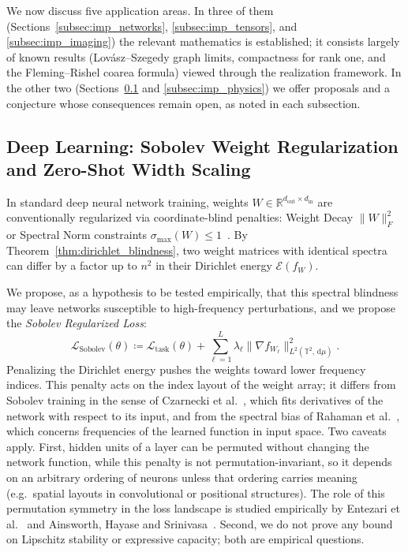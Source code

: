 \documentclass[11pt,a4paper,reqno]{amsart}
\theoremstyle{definition}
\numberwithin{equation}{section}
\newcommand{\R}{\mathbb{R}}
\newcommand{\Tor}{\mathbb{T}}
\newcommand{\dif}{\,\mathrm{d}}
\begin{document}
We now discuss five application areas. In three of them (Sections~\ref{subsec:imp_networks}, \ref{subsec:imp_tensors}, and \ref{subsec:imp_imaging}) the relevant mathematics is established; it consists largely of known results (Lov\'asz--Szegedy graph limits, compactness for rank one, and the Fleming--Rishel coarea formula) viewed through the realization framework. In the other two (Sections~\ref{subsec:imp_dl} and \ref{subsec:imp_physics}) we offer proposals and a conjecture whose consequences remain open, as noted in each subsection.

\subsection{Deep Learning: Sobolev Weight Regularization and Zero-Shot Width Scaling}
\label{subsec:imp_dl}
In standard deep neural network training, weights $W \in \R^{d_{\mathrm{out}} \times d_{\mathrm{in}}}$ are conventionally regularized via coordinate-blind penalties: Weight Decay $\|W\|_F^2$ or Spectral Norm constraints $\sigma_{\max}(W) \le 1$~\cite{yoshida2017spectral,miyato2018spectral}. By Theorem~\ref{thm:dirichlet_blindness}, two weight matrices with identical spectra can differ by a factor up to $n^2$ in their Dirichlet energy $\mathcal{E}(f_W)$.

We propose, as a hypothesis to be tested empirically, that this spectral blindness may leave networks susceptible to high-frequency perturbations, and we propose the \emph{Sobolev Regularized Loss}:
\begin{equation}
    \label{eq:sobolev_loss}
    \mathcal{L}_{\mathrm{Sobolev}}(\theta) \coloneqq \mathcal{L}_{\mathrm{task}}(\theta) + \sum_{\ell=1}^L \lambda_\ell \|\nabla f_{W_\ell}\|_{L^2(\Tor^2, \dif\mu)}^2.
\end{equation}
Penalizing the Dirichlet energy pushes the weights toward lower frequency indices. This penalty acts on the index layout of the weight array; it differs from Sobolev training in the sense of Czarnecki et al.~\cite{czarnecki2017sobolev}, which fits derivatives of the network with respect to its input, and from the spectral bias of Rahaman et al.~\cite{rahaman2019spectral}, which concerns frequencies of the learned function in input space. Two caveats apply. First, hidden units of a layer can be permuted without changing the network function, while this penalty is not permutation-invariant, so it depends on an arbitrary ordering of neurons unless that ordering carries meaning (e.g.\ spatial layouts in convolutional or positional structures). The role of this permutation symmetry in the loss landscape is studied empirically by Entezari et al.~\cite{entezari2022role} and Ainsworth, Hayase and Srinivasa~\cite{ainsworth2023git}. Second, we do not prove any bound on Lipschitz stability or expressive capacity; both are empirical questions.
\end{document}
